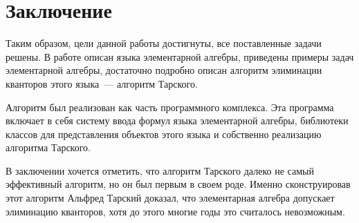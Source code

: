 \section*{Заключение}

Таким образом, цели данной работы достигнуты, все поставленные задачи решены. В работе описан языка элементарной алгебры, приведены примеры задач элементарной алгебры, достаточно подробно описан алгоритм элиминации кванторов этого языка~--- алгоритм Тарского. 

Алгоритм был реализован как часть программного комплекса. Эта программа включает в себя систему ввода формул языка элементарной алгебры, библиотеки классов для представления объектов этого языка и собственно реализацию алгоритма Тарского.

В заключении хочется отметить, что алгоритм Тарского далеко не самый эффективный алгоритм, но он был первым в своем роде. Именно сконструировав этот алгоритм Альфред Тарский доказал, что элементарная алгебра допускает элиминацию кванторов, хотя до этого многие годы это считалось невозможным. 